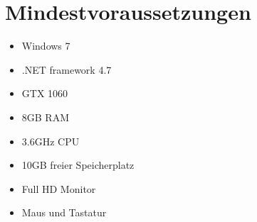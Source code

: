 \section{Mindestvoraussetzungen}

%
%

\begin{itemize}[leftmargin=*, nosep]
    \item Windows 7
    \item .NET framework 4.7
    \item GTX 1060
    \item 8GB RAM
    \item 3.6GHz CPU
    \item 10GB freier Speicherplatz
    \item Full HD Monitor
    \item Maus und Tastatur
\end{itemize}
